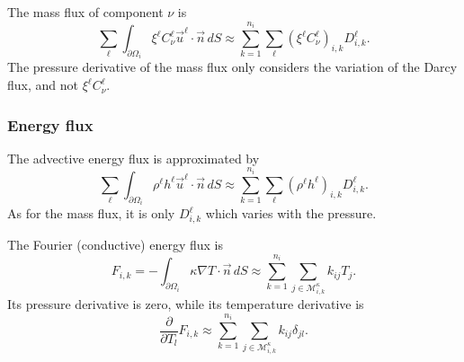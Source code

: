 The mass flux of component $\nu$ is
\begin{equation}
  \sum_\ell \int_{\partial\Omega_i} \xi^\ell C_\nu^\ell \vec
  u^\ell\cdot\vec n\, dS \approx
  \sum_{k=1}^{n_i} \sum_\ell
  \left(\xi^\ell C_\nu^\ell\right)_{i,k}
  D_{i,k}^\ell.
\end{equation}
The pressure derivative of the mass flux only considers the variation
of the Darcy flux, and not $\xi^\ell C_\nu^\ell$.


\subsubsection{Energy flux}

The advective energy flux is approximated by
\begin{equation}
  \sum_\ell \int_{\partial\Omega_i} \rho^\ell h^\ell \vec
  u^\ell\cdot\vec n\, dS \approx
  \sum_{k=1}^{n_i} \sum_\ell
  \left(\rho^\ell h^\ell\right)_{i,k}
  D_{i,k}^\ell.
\end{equation}
As for the mass flux, it is only $D_{i,k}^\ell$ which varies with the
pressure.



The Fourier (conductive) energy flux is
\begin{equation}
  F_{i,k} = -\int_{\partial\Omega_i} \kappa\nabla T\cdot\vec n\, dS
  \approx
  \sum_{k=1}^{n_i} \sum_{j\in\mathcal{M}_{i,k}^\kappa} k_{ij} T_j.
\end{equation}
Its pressure derivative is zero, while its temperature derivative is
\begin{equation}
  \frac{\partial}{\partial T_l} F_{i,k} \approx
  \sum_{k=1}^{n_i} \sum_{j\in\mathcal{M}_{i,k}^\kappa} k_{ij} \delta_{jl}.
\end{equation}




